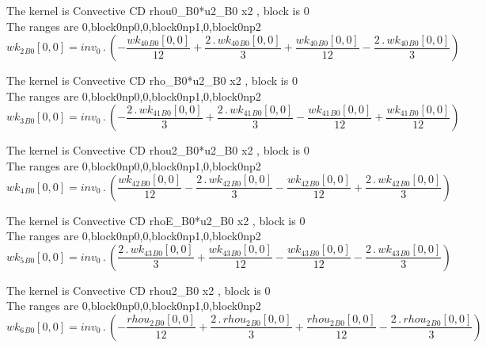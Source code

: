 \documentclass{article}
\begin{document}
\noindent The kernel is Convective CD rhou0_B0*u2_B0 x2 , block is 0\\\noindent The ranges are 0,block0np0,0,block0np1,0,block0np2\\\begin{dmath}{wk_{2}{_{B0}}}[{0,0}] = inv_0 \,.\, \left(- \frac{{wk_{40}{_{B0}}}[{0,0}]}{12} + \frac{2 \,.\, {wk_{40}{_{B0}}}[{0,0}]}{3} + \frac{{wk_{40}{_{B0}}}[{0,0}]}{12} - \frac{2 \,.\, {wk_{40}{_{B0}}}[{0,0}]}{3}\right)\end{dmath}

\noindent The kernel is Convective CD rho_B0*u2_B0 x2 , block is 0\\\noindent The ranges are 0,block0np0,0,block0np1,0,block0np2\\\begin{dmath}{wk_{3}{_{B0}}}[{0,0}] = inv_0 \,.\, \left(- \frac{2 \,.\, {wk_{41}{_{B0}}}[{0,0}]}{3} + \frac{2 \,.\, {wk_{41}{_{B0}}}[{0,0}]}{3} - \frac{{wk_{41}{_{B0}}}[{0,0}]}{12} + \frac{{wk_{41}{_{B0}}}[{0,0}]}{12}\right)\end{dmath}

\noindent The kernel is Convective CD rhou2_B0*u2_B0 x2 , block is 0\\\noindent The ranges are 0,block0np0,0,block0np1,0,block0np2\\\begin{dmath}{wk_{4}{_{B0}}}[{0,0}] = inv_0 \,.\, \left(\frac{{wk_{42}{_{B0}}}[{0,0}]}{12} - \frac{2 \,.\, {wk_{42}{_{B0}}}[{0,0}]}{3} - \frac{{wk_{42}{_{B0}}}[{0,0}]}{12} + \frac{2 \,.\, {wk_{42}{_{B0}}}[{0,0}]}{3}\right)\end{dmath}

\noindent The kernel is Convective CD rhoE_B0*u2_B0 x2 , block is 0\\\noindent The ranges are 0,block0np0,0,block0np1,0,block0np2\\\begin{dmath}{wk_{5}{_{B0}}}[{0,0}] = inv_0 \,.\, \left(\frac{2 \,.\, {wk_{43}{_{B0}}}[{0,0}]}{3} + \frac{{wk_{43}{_{B0}}}[{0,0}]}{12} - \frac{{wk_{43}{_{B0}}}[{0,0}]}{12} - \frac{2 \,.\, {wk_{43}{_{B0}}}[{0,0}]}{3}\right)\end{dmath}

\noindent The kernel is Convective CD rhou2_B0 x2 , block is 0\\\noindent The ranges are 0,block0np0,0,block0np1,0,block0np2\\\begin{dmath}{wk_{6}{_{B0}}}[{0,0}] = inv_0 \,.\, \left(- \frac{{rhou_{2}{_{B0}}}[{0,0}]}{12} + \frac{2 \,.\, {rhou_{2}{_{B0}}}[{0,0}]}{3} + \frac{{rhou_{2}{_{B0}}}[{0,0}]}{12} - \frac{2 \,.\, {rhou_{2}{_{B0}}}[{0,0}]}{3}\right)\end{dmath}
\end{document}
